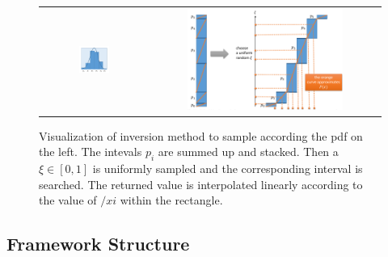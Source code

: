 \documentclass[a4paper,10pt]{article}
\begin{document}
    \begin{center}
        \begin{figure}
            \centering    
            \begin{tabular}{c c}
            \includegraphics[width=0.3\textwidth]{images/impsampling_rectangles.png} &
            \includegraphics[width=0.7\textwidth]{images/inversion.png}
            \end{tabular}
            \caption{
                Visualization of inversion method to sample according the
                pdf on the left.
                The intevals $p_i$ are summed up and stacked.
                Then a $\xi \in [0,1]$ is uniformly sampled and the corresponding
                interval is searched.
                The returned value is interpolated linearly according to the value
                of $/xi$ within the rectangle.
            }
            \label{fig:impsampling}
        \end{figure}
    \end{center}
    
    \subsection{Framework Structure}
\end{document}
